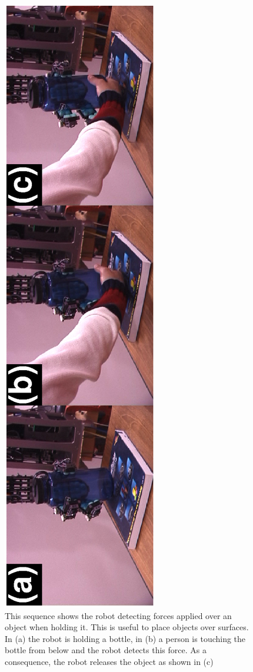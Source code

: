 \begin{figure}[htbp]
\centerline{
\includegraphics[height=\columnwidth, angle=270 ]{./figures/SeqHandDelivery.eps}
} \caption[Detection of forces applied to an object held by the
robot]{This sequence shows the robot detecting forces applied over
an object when holding it. This is useful to place objects over
surfaces. In (a) the robot is holding a bottle, in (b) a person is
touching the bottle from below and the robot detects this force.
As a consequence, the robot releases the object as shown in (c)}
\label{fig:landing}
\end{figure}


